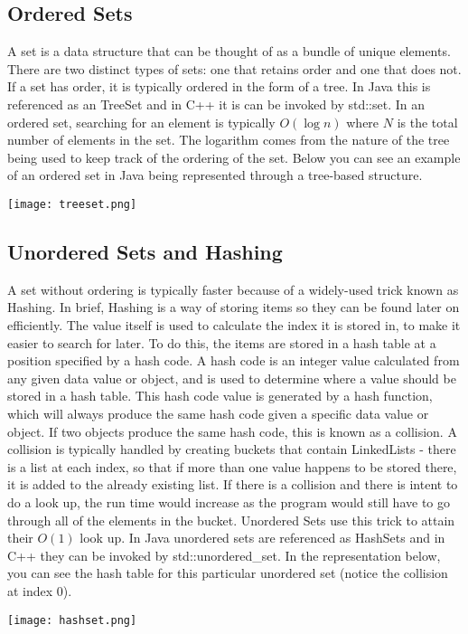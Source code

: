 \subsection{Ordered Sets}

A set is a data structure that can be thought of as a bundle of unique elements. There are two distinct types of sets: one that retains order and one that does not. If a set has order, it is typically ordered in the form of a tree. In Java this is referenced as an TreeSet and in C++ it is can be invoked by std::set. In an ordered set, searching for an element is typically $O(\log n)$ where $N$ is the total number of elements in the set. The logarithm comes from the nature of the tree being used to keep track of the ordering of the set. Below you can see an example of an ordered set in Java being represented through a tree-based structure.

\texttt{[image: treeset.png]}


\subsection{Unordered Sets and Hashing}

A set without ordering is typically faster because of a widely-used trick known as Hashing. In brief, Hashing is a way of storing items so they can be found later on efficiently. The value itself is used to calculate the index it is stored in, to make it easier to search for later. To do this, the items are stored in a hash table at a position specified by a hash code. A hash code is an integer value calculated from any given data value or object, and is used to determine where a value should be stored in a hash table. This hash code value is generated by a hash function, which will always produce the same hash code given a specific data value or object. If two objects produce the same hash code, this is known as a collision. A collision is typically handled by creating buckets that contain LinkedLists - there is a list at each index, so that if more than one value happens to be stored there, it is added to the already existing list. If there is a collision and there is intent to do a look up, the run time would increase as the program would still have to go through all of the elements in the bucket. Unordered Sets use this trick to attain their $O(1)$ look up. In Java unordered sets are referenced as HashSets and in C++ they can be invoked by std::unordered\_set. In the representation below, you can see the hash table for this particular unordered set (notice the collision at index 0).

\texttt{[image: hashset.png]} 


